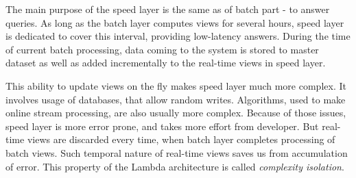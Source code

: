 The main purpose of the speed layer is the same as of batch part - to answer queries.
As long as the batch layer computes views for several hours, speed layer is dedicated to cover this interval, providing low-latency answers.
During the time of current batch processing, data coming to the system is stored to master dataset as well as added incrementally to the real-time views in speed layer.

This ability to update views on the fly makes speed layer much more complex.
It involves usage of databases, that allow random writes.
Algorithms, used to make online stream processing, are also usually more complex.
Because of those issues, speed layer is more error prone, and takes more effort from developer.
But real-time views are discarded every time, when batch layer completes processing of batch views.
Such temporal nature of real-time views saves us from accumulation of error.
This property of the Lambda architecture is called \textit{complexity isolation}.